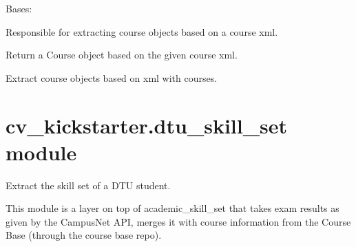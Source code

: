 \documentclass[letterpaper,10pt,english]{sphinxmanual}
\begin{document}

\begin{fulllineitems}
\label{cv_kickstarter:cv_kickstarter.dtu_course_base.CourseExtractor}
Bases: 

Responsible for extracting course objects based on a course xml.

\begin{fulllineitems}
\label{cv_kickstarter:cv_kickstarter.dtu_course_base.CourseExtractor.course}
Return a Course object based on the given course xml.

\end{fulllineitems}


\end{fulllineitems}


\begin{fulllineitems}
\label{cv_kickstarter:cv_kickstarter.dtu_course_base.courses_from_xml}
Extract course objects based on xml with courses.

\end{fulllineitems}



\section{cv\_kickstarter.dtu\_skill\_set module}
\label{cv_kickstarter:module-cv_kickstarter.dtu_skill_set}\label{cv_kickstarter:cv-kickstarter-dtu-skill-set-module}
Extract the skill set of a DTU student.

This module is a layer on top of academic\_skill\_set that takes exam results
as given by the CampusNet API, merges it with course information from
the Course Base (through the course base repo).
\end{document}
